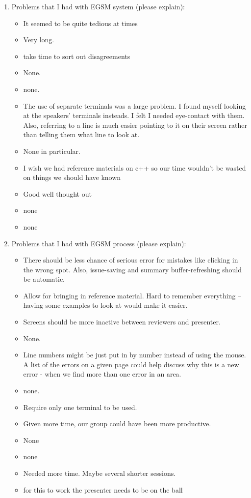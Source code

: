 \begin{enumerate}
\item Problems that I had with EGSM system (please explain): 
\begin{itemize}
\item It seemed to be quite tedious at times
\item Very long.
\item take time to sort out disagreements

\item None.
\item none.
\item The use of separate terminals was a large problem.  I found myself
looking at the speakers' terminals insteads.  I felt I needed
eye-contact with them.  Also, referring to a line is much easier
pointing to it on their screen rather than telling them what line to
look at.
\item None in particular.
\item I wish we had reference materials on c++ so our time wouldn't be
wasted on things we should have known

\item Good well thought out
\item none
\item none
\end{itemize}

\item Problems that I had with EGSM process (please explain): 

\begin{itemize}
\item There should be less chance of serious error for mistakes like
clicking in the wrong spot.  Also, issue-saving and summary
buffer-refreshing should be automatic.
\item Allow for bringing in reference material.  Hard to remember everything
-- having some examples to look at would make it easier.
\item Screens should be more inactive between reviewers and presenter.

\item None.
\item Line numbers might be just put in by number instead of using the
mouse.  A list of the errors on a given page could help discuss why
this is a new error - when we find more than one error in an area.
\item none.
\item Require only one terminal to be used.  
\item Given more time, our group could have been more productive.
\item None
\item none
\item Needed more time.  Maybe several shorter sessions.
\item for this to work the presenter needs to be on the  ball
\end{itemize}



\end{enumerate}
